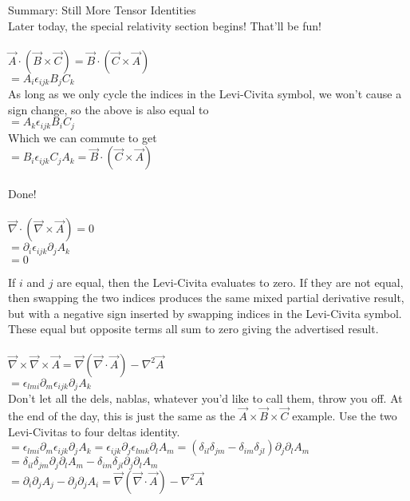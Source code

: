 \documentclass[prb,preprint]
{revtex4-1}
\begin{document}
Summary:  Still More Tensor Identities\\
Later today, the special relativity section begins!  That'll be fun!
\\
\\
$\vec{A} \cdot \left(\vec{B} \times \vec{C}\right) = \vec{B} \cdot \left(\vec{C} \times \vec{A}\right)$
\\
$= A_i \epsilon_{ijk} B_j C_k$
\\
As long as we only cycle the indices in the Levi-Civita symbol, we won't cause a sign change, so the above is also equal to 
\\
$= A_k \epsilon_{ijk} B_i C_j$
\\
Which we can commute to get 
\\
$= B_i \epsilon_{ijk} C_j A_k = \vec{B} \cdot \left(\vec{C} \times \vec{A}\right)$
\\\\
Done!
\\\\



$\vec{\nabla} \cdot \left(\vec{\nabla} \times \vec{A} \right) = 0$
\\
$=\partial_i \epsilon_{ijk} \partial_j A_k$\\
$= 0$

If $i$ and $j$ are equal, then the Levi-Civita evaluates to zero.  If they are not equal, then swapping the two indices produces the same mixed partial derivative result, but with a negative sign inserted by swapping indices in the Levi-Civita symbol.  These equal but opposite terms all sum to zero giving the advertised result.
\\\\

$\vec{\nabla} \times \vec{\nabla} \times \vec{A} = \vec{\nabla}\left(\vec{\nabla} \cdot \vec{A}\right) - \nabla^2 \vec{A}$
\\
$= \epsilon_{lmi} \partial_m \epsilon_{ijk} \partial_j A_k$
\\
Don't let all the dels, nablas, whatever you'd like to call them, throw you off.  At the end of the day, this is just the same as the $\vec{A} \times \vec{B} \times \vec{C}$ example.  Use the two Levi-Civitas to four deltas identity.\\
$= \epsilon_{lmi} \partial_m \epsilon_{ijk} \partial_j A_k = \epsilon_{ijk} \partial_j \epsilon_{lmk} \partial_l A_m  = \left(\delta_{il}\delta_{jm} - \delta_{im}\delta_{jl}\right)\partial_j\partial_l A_m$
\\
$=\delta_{il}\delta_{jm}\partial_j\partial_l A_m - \delta_{im}\delta_{jl}\partial_j\partial_l A_m$
\\
$= \partial_i \partial_j A_j - \partial_j \partial_j A_i = \vec{\nabla}\left(\vec{\nabla}\cdot \vec{A}\right) - \nabla^2 \vec{A}$
\end{document}
